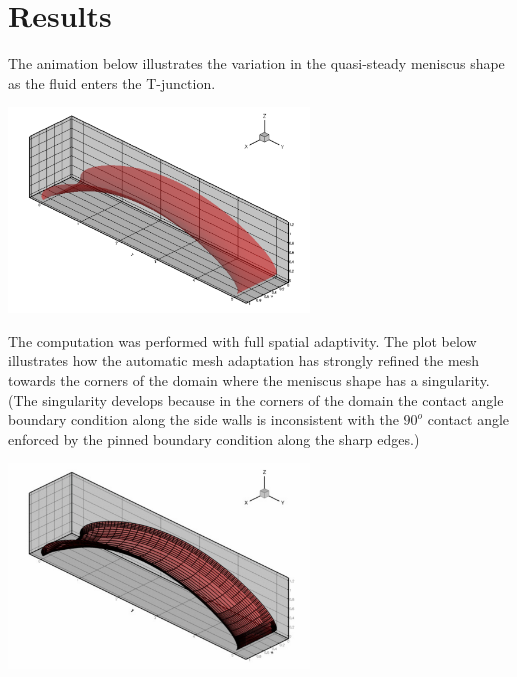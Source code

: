 


 

\hypertarget{index_results}{}\section{Results}\label{index_results}
The animation below illustrates the variation in the quasi-\/steady meniscus shape as the fluid enters the T-\/junction.

 
\begin{DoxyImage}
\includegraphics[width=0.6\textwidth]{t_junction_meniscus}
\end{DoxyImage}


The computation was performed with full spatial adaptivity. The plot below illustrates how the automatic mesh adaptation has strongly refined the mesh towards the corners of the domain where the meniscus shape has a singularity. (The singularity develops because in the corners of the domain the contact angle boundary condition along the side walls is inconsistent with the $ 90^o $ contact angle enforced by the pinned boundary condition along the sharp edges.)

 
\begin{DoxyImage}
\includegraphics[width=0.6\textwidth]{t_junction_meniscus_adapt}
\end{DoxyImage}


